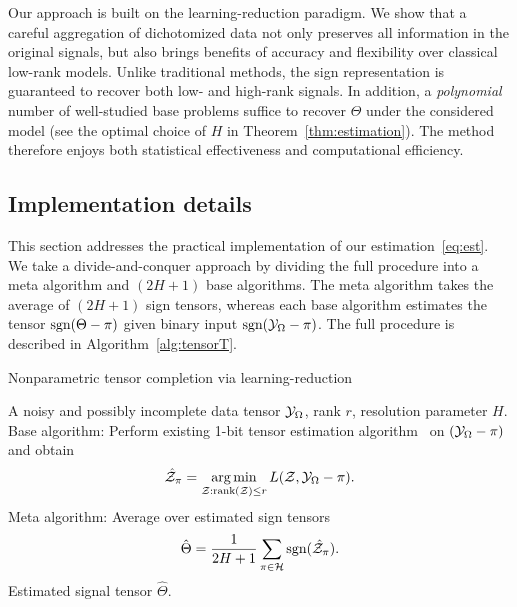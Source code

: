 \documentclass[twoside,11pt]{article}
\theoremstyle{definition}
\def\sign{\textup{sgn}}
\begin{document}
Our approach is built on the learning-reduction paradigm. We show that a careful aggregation of dichotomized data not only preserves all information in the original signals, but also brings benefits of accuracy and flexibility over classical low-rank models. Unlike traditional methods, the sign representation is guaranteed to recover both low- and high-rank signals. In addition, a \emph{polynomial} number of well-studied base problems suffice to recover $\Theta$ under the considered model (see the optimal choice of $H$ in Theorem~\ref{thm:estimation}). The method therefore enjoys both statistical effectiveness and computational efficiency. 

\subsection{Implementation details}
This section addresses the practical implementation of our estimation~\eqref{eq:est}. We take a divide-and-conquer approach by dividing the full procedure into a meta algorithm and $(2H+1)$ base algorithms. The meta algorithm takes the average of $(2H+1)$ sign tensors, whereas each base algorithm estimates the tensor $\sign(\Theta-\pi)$ given binary input $\sign(\tY_\Omega-\pi)$. The full procedure is described in Algorithm~\ref{alg:tensorT}.


\begin{algorithm}[h!]
  \caption{Nonparametric tensor completion via learning-reduction}\label{alg:tensorT}
 \begin{algorithmic}[1] 
\INPUT A noisy and possibly incomplete data tensor $\mathcal{Y}_\Omega$, rank $r$, resolution parameter $H$.
\State Base algorithm: Perform existing 1-bit tensor estimation algorithm~\citep{ghadermarzy2018learning,wang2018learning,hong2020generalized} on $(\mathcal{Y}_\Omega-\pi)$ and obtain 
\begin{align}\label{eq:base}
\hat {\mathcal{Z}}_\pi=\operatorname*{arg\,min}_{\mathcal{Z}: \text{rank}(\mathcal{Z})\leq r} L(\mathcal{Z}, \mathcal{Y}_\Omega-\pi).
\end{align}
\EndFor
\State Meta algorithm: Average over estimated sign tensors 
\begin{align}\label{eq:signal}
\hat \Theta={1\over 2H+1}\sum_{\pi \in \tH}\sign(\hat \tZ_\pi).
\end{align}
\OUTPUT Estimated signal tensor $\hat \Theta$.
\end{algorithmic}
\end{algorithm}
\end{document}
